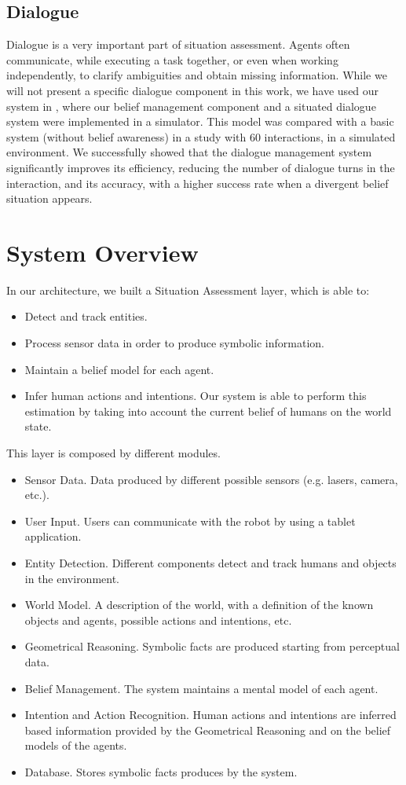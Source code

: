 \subsection{Dialogue}
Dialogue is a very important part of situation assessment. Agents often communicate, while executing a task together, or even when working independently, to clarify ambiguities and obtain missing information. While we will not present a specific dialogue component in this work, we have used our system in \cite{Ferreira2015}, where our belief management component and a situated dialogue system were implemented in a simulator. This model was compared with a basic system (without belief awareness) in a study with 60 interactions, in a simulated environment. We successfully showed that the dialogue management system significantly improves its efficiency, reducing the number of dialogue turns in the interaction, and its accuracy, with a higher success rate when a divergent belief situation appears.

\section{System Overview}
\label{situation_assessment-overview}

In our architecture, we built a Situation Assessment layer, which is able to:
\begin{itemize}
\item  Detect and track entities.
\item  Process sensor data in order to produce symbolic information.
\item  Maintain a belief model for each agent.
\item  Infer human actions and intentions. Our system is able to perform this estimation by taking into account the current belief of humans on the world state. 
\end{itemize} 

This layer is composed by different modules.
\begin{itemize}
\item Sensor Data. Data produced by different possible sensors (e.g. lasers, camera, etc.).
\item User Input. Users can communicate with the robot by using a tablet application.
\item Entity Detection. Different components detect and track humans and objects in the environment.
\item World Model. A description of the world, with a definition of the known objects and agents, possible actions and intentions, etc. 
\item Geometrical Reasoning. Symbolic facts are produced starting from perceptual data.
\item Belief Management. The system maintains a mental model of each agent.
\item Intention and Action Recognition. Human actions and intentions are inferred based information provided by the Geometrical Reasoning and on the belief models of the agents.
\item Database. Stores symbolic facts produces by the system.
\end{itemize}

